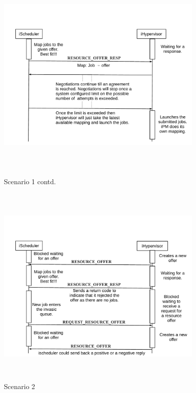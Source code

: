 \begin{figure}[!htbp]
\centering
\includegraphics[width=0.9\textwidth, height=100mm]{./figures/figures1.pdf}
\caption{Scenario 1 contd.}
\label{fig:Seq1}
\vspace{0.25in}
\centering
\includegraphics[width=0.9\textwidth, height=100mm]{./figures/figures2.pdf}
\caption{Scenario 2}
\label{fig:Seq2}
\end{figure}
